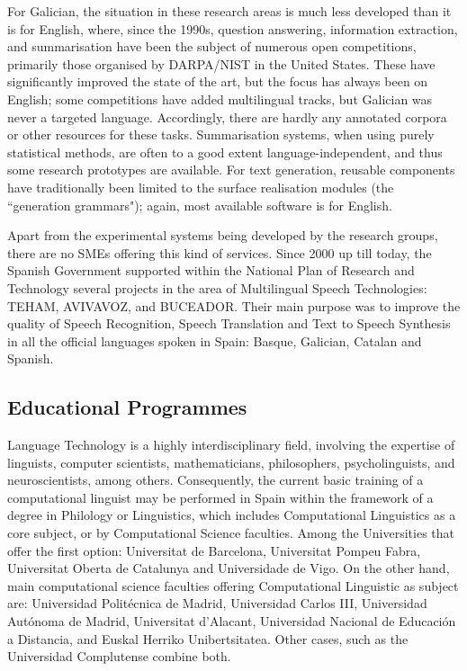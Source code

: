 \begin{multicols}{2}

For Galician, the situation in these research areas is much less developed than it is for English, where, since the 1990s, question answering, information extraction, and summarisation have been the subject of numerous open competitions, primarily those organised by DARPA/NIST in the United States. These have significantly improved the state of the art, but the focus has always been on English; some competitions have added multilingual tracks, but Galician was never a targeted language. Accordingly, there are hardly any annotated corpora or other resources for these tasks. Summarisation systems, when using purely statistical methods, are often to a good extent language-independent, and thus some research prototypes are available. For text generation, reusable components have traditionally been limited to the surface realisation modules (the “generation grammars"); again, most available software is for English. 

Apart from the experimental systems being developed by the research groups, there are no SMEs offering this kind of services. Since 2000 up till today, the Spanish Government supported within the National Plan of Research and Technology several projects in the area of Multilingual Speech Technologies: TEHAM, AVIVAVOZ, and BUCEADOR. Their main purpose was to improve the quality of Speech Recognition, Speech Translation and Text to Speech Synthesis in all the official languages spoken in Spain: Basque, Galician, Catalan and Spanish.


\subsection{Educational Programmes}

   Language Technology is a highly interdisciplinary field, involving the expertise of linguists, computer scientists, mathematicians, philosophers, psycholinguists, and neuroscientists, among others. Consequently, the current basic training of a computational linguist may be performed in Spain within the framework of a degree in Philology or Linguistics, which includes Computational Linguistics as a core subject, or by Computational Science faculties. Among the Universities that offer the first option: Universitat de Barcelona, Universitat Pompeu Fabra, Universitat Oberta de Catalunya and Universidade de Vigo. On the other hand, main computational science faculties offering Computational Linguistic as subject are: Universidad Politécnica de Madrid, Universidad Carlos III, Universidad Autónoma de Madrid, Universitat d’Alacant, Universidad Nacional de Educación a Distancia, and Euskal Herriko Unibertsitatea. Other cases, such as the Universidad Complutense combine both.


\end{multicols}
